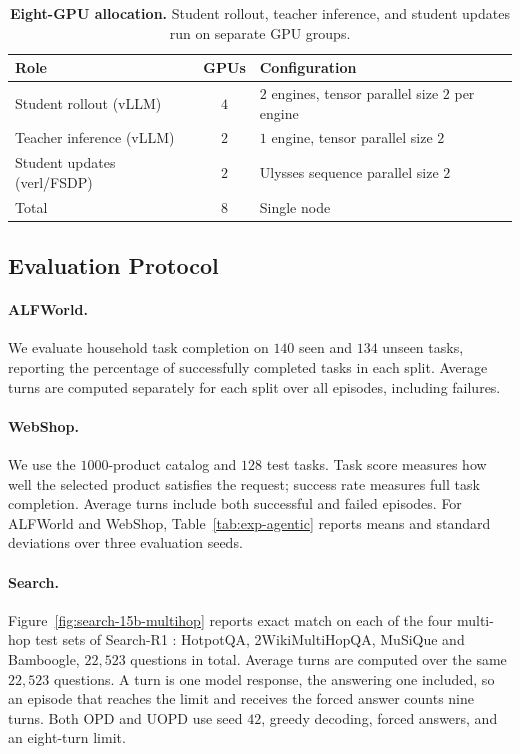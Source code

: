 \begin{table}[!ht]
\centering
\caption{\textbf{Eight-GPU allocation.}
Student rollout, teacher inference, and student updates run on separate GPU groups.}
\label{tab:app-gpu-allocation}
\small
\setlength{\tabcolsep}{5pt}
\begin{tabular}{@{}l c l@{}}
\toprule
Role & GPUs & Configuration \\
\midrule
Student rollout (vLLM) & $4$ & $2$ engines, tensor parallel size $2$ per engine \\
Teacher inference (vLLM) & $2$ & $1$ engine, tensor parallel size $2$ \\
Student updates (verl/FSDP) & $2$ & Ulysses sequence parallel size $2$ \\
\midrule
Total & $8$ & Single node \\
\bottomrule
\end{tabular}
\end{table}

\subsection{Evaluation Protocol}
\label{app:evaluation-protocol}

\paragraph{ALFWorld.} We evaluate household task completion on $140$ seen and $134$ unseen
tasks, reporting the percentage of successfully completed tasks in each split. Average turns
are computed separately for each split over all episodes, including failures.

\paragraph{WebShop.} We use the $1000$-product catalog and $128$ test tasks. Task score measures
how well the selected product satisfies the request; success rate measures full task completion.
Average turns include both successful and failed episodes.
For ALFWorld and WebShop, Table~\ref{tab:exp-agentic} reports means and standard deviations
over three evaluation seeds.

\paragraph{Search.} Figure~\ref{fig:search-15b-multihop} reports exact match on each of the four
multi-hop test sets of Search-R1 \citep{jin2025searchr1}: HotpotQA, 2WikiMultiHopQA, MuSiQue and
Bamboogle, $22{,}523$ questions in total. Average turns are computed over the same $22{,}523$
questions. A turn is one model response, the answering one included, so an episode that reaches the
limit and receives the forced answer counts nine turns.
Both OPD and UOPD use seed $42$, greedy decoding, forced answers, and an eight-turn limit.

